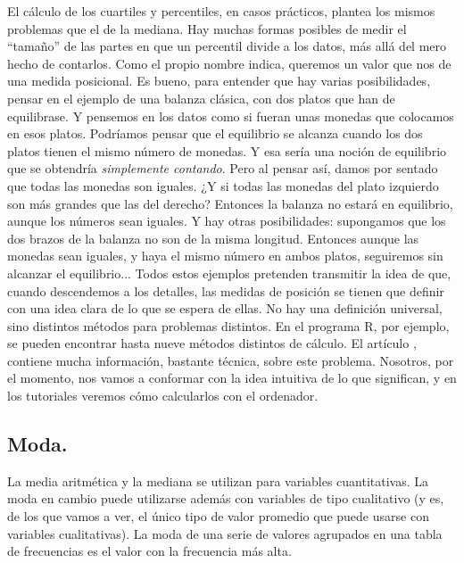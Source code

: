 El cálculo de los cuartiles y percentiles, en casos prácticos,  plantea los mismos problemas que el
de la mediana. Hay muchas formas posibles de medir el ``tamaño'' de las partes en que un percentil
divide a los datos, más allá del mero hecho de contarlos.  Como el propio nombre indica, queremos
un valor que nos de una medida posicional. Es bueno, para entender que hay varias posibilidades,
pensar en el ejemplo de una balanza clásica, con dos platos que han de equilibrase. Y pensemos en
los datos como si fueran unas monedas que colocamos en esos platos. Podríamos pensar que el
equilibrio se alcanza cuando los dos platos tienen el mismo número de monedas. Y esa sería una
noción de equilibrio que se obtendría {\em simplemente contando}. Pero al pensar así, damos por
sentado que todas las monedas son iguales. ¿Y si todas las monedas del plato izquierdo son más
grandes que las del derecho? Entonces la balanza no estará en equilibrio, aunque los números sean
iguales. Y hay otras posibilidades: supongamos que los dos brazos de la balanza no son de la misma
longitud. Entonces aunque las monedas sean iguales, y haya el mismo número en ambos platos,
seguiremos sin alcanzar el equilibrio... Todos estos ejemplos pretenden transmitir la idea de que,
cuando descendemos a los detalles, las medidas de posición se tienen que definir con una idea clara
de lo que se espera de ellas. No hay una definición universal, sino distintos métodos para
problemas distintos. En el programa R, por ejemplo, se pueden encontrar hasta nueve métodos distintos de
cálculo. El artículo \cite{hyndman1996sample}, contiene mucha información, bastante técnica, sobre
este problema. Nosotros, por el momento, nos vamos a conformar con la idea intuitiva de lo que
significan, y en los tutoriales veremos cómo calcularlos con el ordenador.

\subsection{Moda.}
\label{cap02:subsec:Moda}

La media aritmética y la mediana se utilizan para variables cuantitativas. La
moda en cambio puede utilizarse además con variables de tipo cualitativo (y es,
de los que vamos a ver, el único tipo de valor promedio que puede usarse con
variables cualitativas). {\sf La moda}  de una serie de valores
agrupados en una tabla de frecuencias es el valor con la frecuencia más alta.

